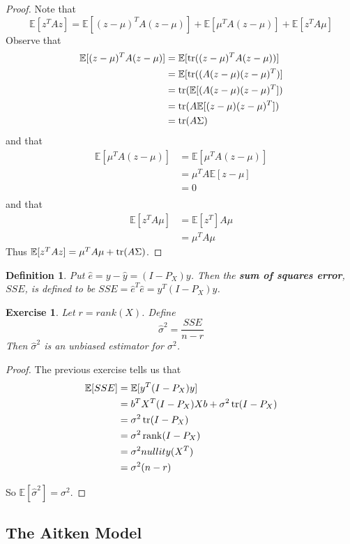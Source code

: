 \documentclass[12pt]{amsart}
\newtheorem{defn}[thm]{Definition}
\newtheorem{ex}[thm]{Exercise}
\newcommand{\sig}{\sigma}
\newcommand{\Sig}{\Sigma}
\newcommand{\E}{\mathbb{E}}
\begin{document}
\begin{proof}
Note that $$\E[z^TAz] =  \E[(z-\mu)^TA(z-\mu)] + \E[\mu^TA(z - \mu)] + \E[z^TA\mu] $$
Observe that
\begin{align*}
\E[(z-\mu)^TA(z-\mu)] 
&= \E[\trace((z-\mu)^TA(z-\mu))] \\
&= \E[\trace((A(z-\mu)(z-\mu)^T)] \\
&= \trace(\E[(A(z-\mu)(z-\mu)^T]) \\
&= \trace (A \E[(z-\mu)(z-\mu)^T]) \\
&= \trace (A \Sig) \\
\end{align*}
and that 
\begin{align*}
\E[\mu^TA(z - \mu)]
&= \E[\mu^TA(z-\mu)] \\
&= \mu^TA \E[z-\mu] \\
&= 0 \\
\end{align*}
and that 
\begin{align*}
\E[z^TA\mu]
&= \E[z^T]A \mu \\
&= \mu^T A \mu
\end{align*}
Thus $\E[z^TAz] = \mu^T A \mu + \trace(A\Sig)$.
\end{proof}

\begin{defn}
Put $\hat{e} = y - \hat{y} = (I-P_X)y$. Then the \textbf{sum of squares error}, $SSE$, is defined to be $SSE = \hat{e}^T\hat{e} = y^T(I-P_X)y$.
\end{defn}

\begin{ex}
Let $r = rank(X)$. Define $$\hat{\sig}^2 = \frac{SSE}{n-r}$$ Then $\hat{\sig}^2$ is an unbiased estimator for $\sig^2$. 
\end{ex}

\begin{proof}
The previous exercise tells us that 
\begin{align*}
\E[SSE] 
&= \E[y^T(I-P_X)y] \\
&= b^TX^T(I-P_X)Xb + \sig^2 \trace(I-P_X) \\
&= \sig^2 \trace(I-P_X) \\
&= \sig^2 \rank(I-P_X) \\
&= \sig^2 nullity(X^T) \\
&= \sig^2(n-r)
\end{align*}

So $\E[\hat{\sig}^2] = \sig^2$.
\end{proof}

\subsection{The Aitken Model}
\end{document}
